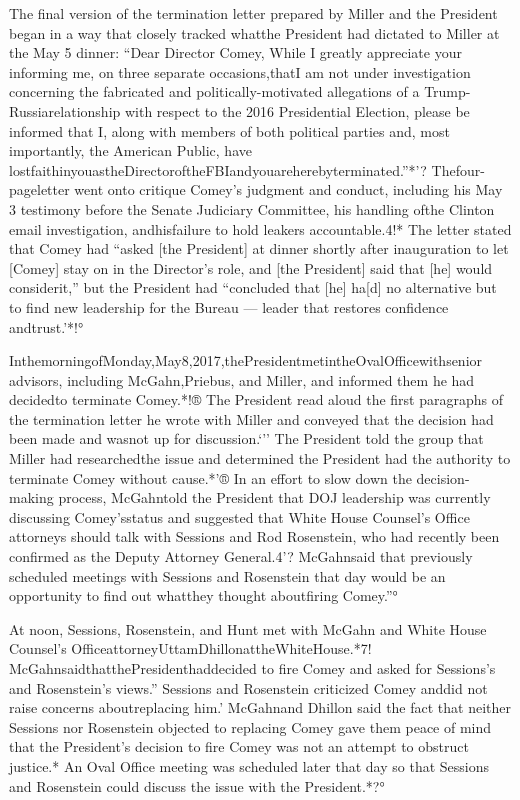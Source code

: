 {The final version of the termination letter prepared by Miller and the President began in a way that closely tracked whatthe President had dictated to Miller at the May 5 dinner: “Dear Director Comey, While I greatly appreciate your informing me, on three separate occasions,thatI am not under investigation concerning the fabricated and politically-motivated allegations of a Trump-Russiarelationship with respect to the 2016 Presidential Election, please be informed that I, along with members of both political parties and, most importantly, the American Public, have lostfaithinyouastheDirectoroftheFBIandyouareherebyterminated.”*'?
Thefour-pageletter went onto critique Comey’s judgment and conduct, including his May 3 testimony before the
Senate Judiciary Committee, his handling ofthe Clinton email investigation, andhisfailure to hold leakers accountable.4!*
The letter stated that Comey had “asked [the President] at dinner shortly after inauguration to let [Comey] stay on in the Director’s role, and [the President] said that [he]
would considerit,” but the President had “concluded that [he] ha[d] no alternative but to find new leadership for the Bureau — leader that restores confidence andtrust.’*!°

InthemorningofMonday,May8,2017,thePresidentmetintheOvalOfficewithsenior advisors, including McGahn,Priebus, and Miller, and informed them he had decidedto terminate Comey.*!®
The President read aloud the first paragraphs of the termination letter he wrote with Miller and conveyed that the decision had been made and wasnot up for discussion.‘'’
The President told the group that Miller had researchedthe issue and determined the President had the authority to terminate Comey without cause.*'®
In an effort to slow down the decision-making process, McGahntold the President that DOJ leadership was currently discussing Comey’sstatus and suggested that White House Counsel’s Office attorneys should talk with Sessions and Rod Rosenstein, who had recently been confirmed as the Deputy Attorney General.4'?
McGahnsaid that previously scheduled meetings with Sessions and Rosenstein that day would be an opportunity to find out whatthey thought aboutfiring Comey.”°

At noon, Sessions, Rosenstein, and Hunt met with McGahn and White House Counsel’s OfficeattorneyUttamDhillonattheWhiteHouse.*7!
McGahnsaidthatthePresidenthaddecided to fire Comey and asked for Sessions’s and Rosenstein’s views.”
Sessions and Rosenstein criticized Comey anddid not raise concerns aboutreplacing him.’
McGahnand Dhillon said the fact that neither Sessions nor Rosenstein objected to replacing Comey gave them peace of mind that the President’s decision to fire Comey was not an attempt to obstruct justice.*
An Oval Office meeting was scheduled later that day so that Sessions and Rosenstein could discuss the issue with the President.*?°

}
